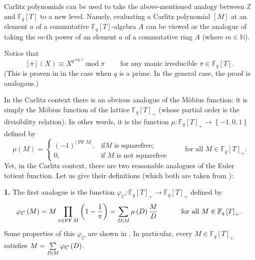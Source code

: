 \documentclass[numbers=enddot,12pt,final,onecolumn,notitlepage]{scrartcl}%
\theoremstyle{definition}
\let\sumnonlimits\sum
\let\prodnonlimits\prod
\renewcommand{\sum}{\sumnonlimits\limits}
\renewcommand{\prod}{\prodnonlimits\limits}
\begin{document}
Carlitz polynomials can be used to take the above-mentioned analogy between
$\mathbb{Z}$ and $\mathbb{F}_{q}\left[  T\right]  $ to a new level. Namely,
evaluating a Carlitz polynomial $\left[  M\right]  $ at an element $a$ of a
commutative $\mathbb{F}_{q}\left[  T\right]  $-algebra $A$ can be viewed as
the analogue of taking the $m$-th power of an element $a$ of a commutative
ring $A$ (where $m\in\mathbb{N}$).

Notice that%
\begin{equation}
\left[  \pi\right]  \left(  X\right)  \equiv X^{q^{\deg\pi}}\operatorname{mod}%
\pi\ \ \ \ \ \ \ \ \ \ \text{for any monic irreducible }\pi\in\mathbb{F}%
_{q}\left[  T\right]  . \label{carlitz-piX}%
\end{equation}
(This is proven in \cite[Theorem 2.11]{kc-carlitz} in the case when $q$ is a
prime. In the general case, the proof is analogous.)

In the Carlitz context there is an obvious analogue of the M\"{o}bius
function: it is simply the M\"{o}bius function of the lattice $\mathbb{F}%
_{q}\left[  T\right]  _{+}$ (whose partial order is the divisibility
relation). In other words, it is the function $\mu:\mathbb{F}_{q}\left[
T\right]  _{+}\rightarrow\left\{  -1,0,1\right\}  $ defined by%
\[
\mu\left(  M\right)  =%
\begin{cases}
\left(  -1\right)  ^{\left\vert \operatorname*{PF}M\right\vert }, & \text{if
}M\text{ is squarefree;}\\
0, & \text{if }M\text{ is not squarefree}%
\end{cases}
\ \ \ \ \ \ \ \ \ \ \text{for all }M\in\mathbb{F}_{q}\left[  T\right]  _{+}.
\]
Yet, in the Carlitz context, there are two reasonable analogues of the Euler
totient function. Let us give their definitions (which both are taken from
\cite{kc-carlitz}):

\textbf{1.} The first analogue is the function $\varphi_{C}:\mathbb{F}%
_{q}\left[  T\right]  _{+}\rightarrow\mathbb{F}_{q}\left[  T\right]  _{+}$
defined by%
\[
\varphi_{C}\left(  M\right)  =M\prod\limits_{\pi\in\operatorname*{PF}M}\left(
1-\dfrac{1}{\pi}\right)  =\sum\limits_{D\mid M}\mu\left(  D\right)  \dfrac
{M}{D}\ \ \ \ \ \ \ \ \ \ \text{for all }M\in\mathbb{F}_{q}\left[  T\right]
_{+}.
\]
Some properties of this $\varphi_{C}$ are shown in \cite[Theorem
4.6]{kc-carlitz}. In particular, every $M\in\mathbb{F}_{q}\left[  T\right]
_{+}$ satisfies $M=\sum\limits_{D\mid M}\varphi_{C}\left(  D\right)  $.
\end{document}
